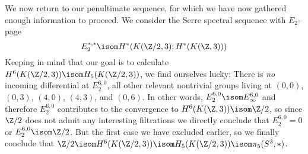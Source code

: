 \begin{solution}
	We now return to our penultimate sequence, for which we have now gathered enough information to proceed.
	We consider the Serre spectral sequence with $E_2$-page
	\begin{equation*}
		E_2^{*, *} \isom H^*(K(\Zn{2}, 3); H^*(K(\Z, 3)))
	\end{equation*}
	Keeping in mind that our goal is to calculate $H^6(K(\Zn{2}, 3)) \isom H_5(K(\Zn{2}, 3))$, we find ourselves lucky:
	There is \emph{no} incoming differential at $E_2^{6, 0}$, all other relevant nontrivial groups living at $(0, 0)$, $(0, 3)$, $(4, 0)$, $(4, 3)$, and $(0, 6)$.
	In other words, $E_2^{6, 0} \isom E_\infty^{6, 0}$ and therefore $E_2^{6, 0}$ contributes to the convergence to $H^6(K(\Z, 3)) \isom \Zn{2}$, so since $\Zn{2}$ does not admit any interesting filtrations we directly conclude that $E_2^{6, 0} = 0$ or $E_2^{6, 0} \isom \Zn{2}$.
	But the first case we have excluded earlier, so we finally conclude that $\Zn{2} \isom H^6(K(\Zn{2}, 3)) \isom H_5(K(\Zn{2}, 3)) \isom \pi_5(S^3, *)$.
\end{solution}

